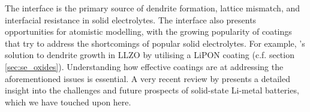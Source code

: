 \documentclass[../main.tex]{subfiles}
\begin{document}
The interface is the primary source of dendrite formation, lattice mismatch, and interfacial resistance in solid electrolytes. The interface also presents opportunities for atomistic modelling, with the growing popularity of coatings that try to address the shortcomings of popular solid electrolytes.\cite{Kim2020, Xu2018exp, Chen2020se_coat, Ito2017, Yin2020, Ji2020coating, Li2020coating, Yi2021coating, Dai2021coating, Pan2020coating, Jing2020coating, Wang2021coating, Zhao2020coating, Zhao2021coating, Liang2020coating, Zhang2020coating} For example, \citeauthor{Tian2018}'s solution to dendrite growth in LLZO by utilising a LiPON coating\cite{Tian2018} (c.f. section \ref{sec:se_oxides}). Understanding how effective coatings are at addressing the aforementioned issues is essential.\cite{Zhang2020directvis, Xiao2019coat, Tian2018} A very recent review by \citeauthor{kim2021solid} presents a detailed insight into the challenges and future prospects of solid-state Li-metal batteries, which we have touched upon here.\cite{kim2021solid}
\end{document}

